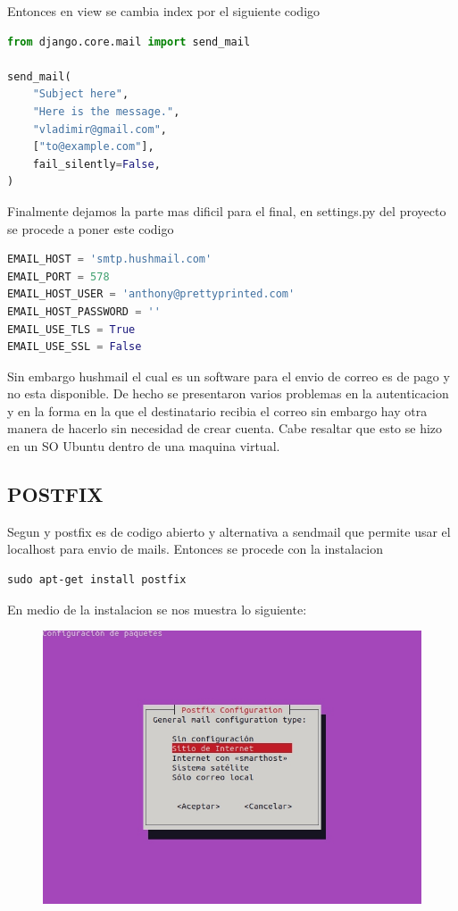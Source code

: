 \documentclass{article}
\begin{document}
Entonces en view se cambia index por el siguiente codigo
\begin{lstlisting}[language=Python]
from django.core.mail import send_mail

send_mail(
    "Subject here",
    "Here is the message.",
    "vladimir@gmail.com",
    ["to@example.com"],
    fail_silently=False,
)
\end{lstlisting}

Finalmente dejamos la parte  mas dificil para el final, en settings.py del proyecto se procede a poner este codigo

\begin{lstlisting}[language=Python]
EMAIL_HOST = 'smtp.hushmail.com'
EMAIL_PORT = 578
EMAIL_HOST_USER = 'anthony@prettyprinted.com'
EMAIL_HOST_PASSWORD = ''
EMAIL_USE_TLS = True
EMAIL_USE_SSL = False
\end{lstlisting}

Sin embargo hushmail el cual es un software para el envio de correo es de pago y no esta disponible. De hecho se presentaron varios problemas en la autenticacion y en la forma en la que el destinatario recibia el correo sin embargo hay otra manera de hacerlo sin necesidad de crear cuenta. Cabe resaltar que esto se hizo en un SO Ubuntu dentro de una maquina virtual.

\subsection{POSTFIX}

Segun \cite{postfix} y \cite{postfixwiki} postfix es de codigo abierto y alternativa a sendmail que permite usar el localhost para envio de mails.
Entonces se procede con la instalacion

\begin{lstlisting}
sudo apt-get install postfix
\end{lstlisting}

En medio de la instalacion se nos muestra lo siguiente:

\newpage

\begin{figure}[!h]
    \centering
    \includegraphics[scale=1.5]{img/postfix2.jpg}
    \caption{}
    \label{fig:enter-label}
\end{figure}
\end{document}
